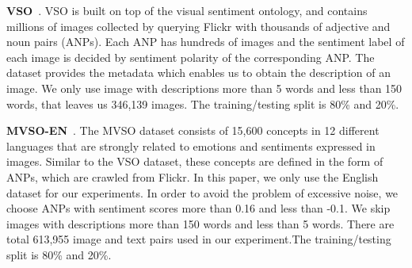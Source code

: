 \documentclass{article}
\begin{document}
\textbf{VSO}~\cite{borth2013large}. VSO is built on top of the visual sentiment ontology,  and contains millions of images collected by querying Flickr with thousands of adjective and noun pairs (ANPs). Each ANP has hundreds of images and the sentiment label of each image is decided by sentiment polarity of the corresponding ANP. The dataset provides the metadata which enables us to obtain the description of an image. We only use image with descriptions more than 5 words and less than 150 words, that leaves us 346,139 images. The training/testing split is 80\% and 20\%.

\textbf{MVSO-EN}~\cite{jou2015visual}. The MVSO dataset consists of 15,600 concepts in 12 \mbox{different} languages that are strongly related to emotions and sentiments expressed in images. Similar to the VSO dataset, these concepts are defined in the form of ANPs,  which are crawled from Flickr. In this paper, we only use the English dataset for our experiments. In order to avoid the problem of excessive noise,  we choose ANPs with sentiment scores more than 0.16 and less than -0.1. We skip images with descriptions more than 150 words and less than 5 \mbox{words}. There are total 613,955 image and text pairs used in our experiment.The training/testing split is 80\% and 20\%.


\end{document}
